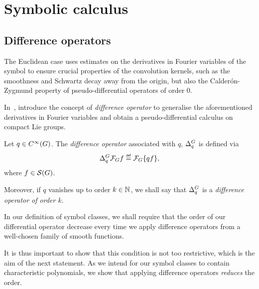 \chapter{Symbolic calculus}
\label{chapter:symbolic_calculus}

\section{Difference operators}

The Euclidean case uses estimates on the derivatives in Fourier variables of the symbol
to ensure crucial properties of the convolution kernels,
such as the smoothness and Schwartz decay away from the origin,
but also the Calder\'on-Zygmund property of pseudo-differential operators of order $0$.

In~\cite{RuzhanskyTurunen10},
\citeauthor{RuzhanskyTurunen10} introduce the concept of \emph{difference operator}
to generalise the aforementioned derivatives in Fourier variables
and obtain a pseudo-differential calculus on compact Lie groups.

\begin{definition}
\label{definition:difference_operators}
    Let $q \in {C^\infty(G)}$.
    The \emph{difference operator} associated with $q$, ${\Delta^{G}_{q}}$ is defined via
    \begin{align*}
        \DifferenceOperator{q} \Fourier f \defeq \Fourier\{q f\},
    \end{align*}
    where $f \in {\mathcal{S} (G)}$.

    Moreover, if $q$ vanishes up to order $k \in \mathbb{N}$,
    we shall say that ${\Delta^{G}_{q}}$ is a \emph{difference operator of order $k$}.
\end{definition}

In our definition of symbol classes,
we shall require that the order of our differential operator decrease
every time we apply difference operators from a well-chosen family of smooth functions.

It is thus important to show that this condition is not too restrictive,
which is the aim of the next statement.
As we intend for our symbol classes to contain characteristic polynomials,
we show that applying difference operators \emph{reduces} the order.

